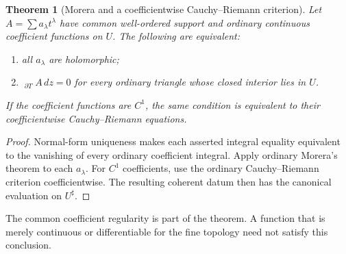 \documentclass[11pt,letterpaper]{article}
\newtheorem{theorem}{Theorem}[section]
\theoremstyle{definition}
\theoremstyle{remark}
\newcommand{\HCoint}{\mathop{\oint^{\!H}}\nolimits}
\newcommand{\sh}{^{\sharp}}
\numberwithin{equation}{section}
\begin{document}
\begin{theorem}[Morera and a coefficientwise Cauchy--Riemann criterion]\label{thm:Morera}
Let $A=\sum a_\lambda t^\lambda$ have common well-ordered support and ordinary continuous coefficient functions on $U$. The following are equivalent:
\begin{enumerate}
\item all $a_\lambda$ are holomorphic;
\item $\HCoint_{\partial T}A\,dz=0$ for every ordinary triangle whose closed interior lies in $U$.
\end{enumerate}
If the coefficient functions are $C^1$, the same condition is equivalent to their coefficientwise Cauchy--Riemann equations.
\end{theorem}
\begin{proof}
Normal-form uniqueness makes each asserted integral equality equivalent to the vanishing of every ordinary coefficient integral. Apply ordinary Morera's theorem to each $a_\lambda$. For $C^1$ coefficients, use the ordinary Cauchy--Riemann criterion coefficientwise. The resulting coherent datum then has the canonical evaluation on $U\sh$.
\end{proof}
The common coefficient regularity is part of the theorem. A function that is merely continuous or differentiable for the fine topology need not satisfy this conclusion.
\end{document}
